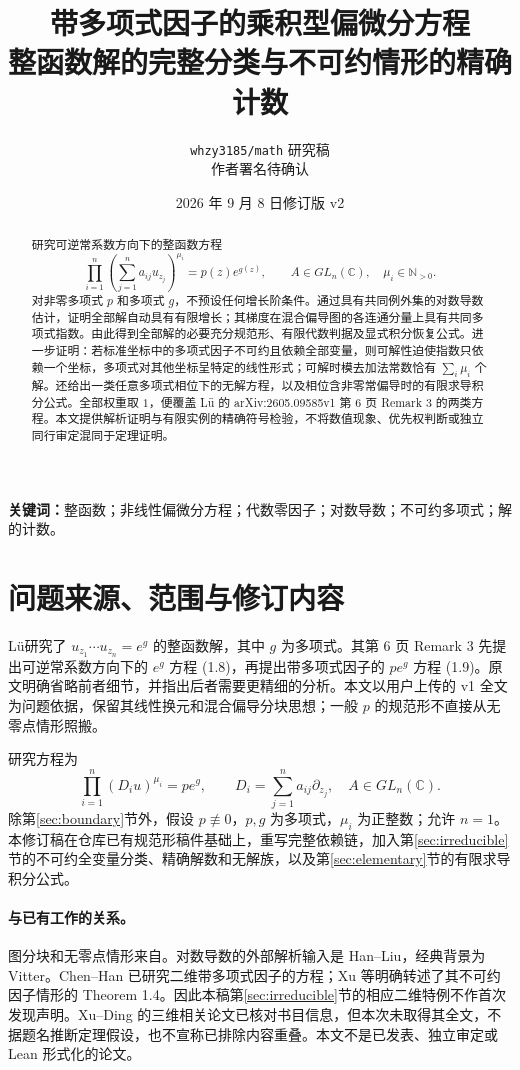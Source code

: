 \documentclass[UTF8,11pt,a4paper,fontset=fandol]{ctexart}
\title{带多项式因子的乘积型偏微分方程\\整函数解的完整分类与不可约情形的精确计数}
\author{\texttt{whzy3185/math} 研究稿\\\small 作者署名待确认}
\date{2026 年 9 月 8 日\quad 修订版 v2}
\theoremstyle{definition}\newtheorem{definition}[theorem]{定义}
\theoremstyle{remark}\newtheorem{remark}[theorem]{注}
\newcommand{\C}{\mathbb C}\newcommand{\N}{\mathbb N}
\begin{document}
\maketitle
\begin{abstract}
研究可逆常系数方向下的整函数方程
\[
\prod_{i=1}^n\left(\sum_{j=1}^n a_{ij}u_{z_j}\right)^{\mu_i}=p(z)e^{g(z)},
\qquad A\in GL_n(\C),\quad \mu_i\in\N_{>0}.
\]
对非零多项式 $p$ 和多项式 $g$，不预设任何增长阶条件。通过具有共同例外集的对数导数估计，证明全部解自动具有有限增长；其梯度在混合偏导图的各连通分量上具有共同多项式指数。由此得到全部解的必要充分规范形、有限代数判据及显式积分恢复公式。进一步证明：若标准坐标中的多项式因子不可约且依赖全部变量，则可解性迫使指数只依赖一个坐标，多项式对其他坐标呈特定的线性形式；可解时模去加法常数恰有 $\sum_i\mu_i$ 个解。还给出一类任意多项式相位下的无解方程，以及相位含非零常偏导时的有限求导积分公式。全部权重取 $1$，便覆盖 Lü 的 arXiv:2605.09585v1 第 6 页 Remark 3 的两类方程。本文提供解析证明与有限实例的精确符号检验，不将数值现象、优先权判断或独立同行审定混同于定理证明。
\end{abstract}
\noindent\textbf{关键词：}整函数；非线性偏微分方程；代数零因子；对数导数；不可约多项式；解的计数。

\section{问题来源、范围与修订内容}
Lü\cite{Lu2026}研究了 $u_{z_1}\cdots u_{z_n}=e^g$ 的整函数解，其中 $g$ 为多项式。其第 6 页 Remark 3 先提出可逆常系数方向下的 $e^g$ 方程 (1.8)，再提出带多项式因子的 $pe^g$ 方程 (1.9)。原文明确省略前者细节，并指出后者需要更精细的分析。本文以用户上传的 v1 全文为问题依据，保留其线性换元和混合偏导分块思想；一般 $p$ 的规范形不直接从无零点情形照搬。

研究方程为
\begin{equation}\label{eq:original}
\prod_{i=1}^n(D_i u)^{\mu_i}=pe^g,
\qquad D_i=\sum_{j=1}^n a_{ij}\partial_{z_j},\quad A\in GL_n(\C).
\end{equation}
除第\ref{sec:boundary}节外，假设 $p\not\equiv0$，$p,g$ 为多项式，$\mu_i$ 为正整数；允许 $n=1$。本修订稿在仓库已有规范形稿件基础上，重写完整依赖链，加入第\ref{sec:irreducible}节的不可约全变量分类、精确解数和无解族，以及第\ref{sec:elementary}节的有限求导积分公式。

\paragraph{与已有工作的关系。}
图分块和无零点情形来自\cite{Lu2026}。对数导数的外部解析输入是 Han--Liu\cite[Theorem 1.1]{HanLiu2025}，经典背景为 Vitter\cite{Vitter1977}。Chen--Han\cite{ChenHan2022} 已研究二维带多项式因子的方程；Xu 等\cite[Theorem D]{XuEtAl2023}明确转述了其不可约因子情形的 Theorem 1.4。因此本稿第\ref{sec:irreducible}节的相应二维特例不作首次发现声明。Xu--Ding\cite{XuDing2026} 的三维相关论文已核对书目信息，但本次未取得其全文，不据题名推断定理假设，也不宣称已排除内容重叠。本文不是已发表、独立审定或 Lean 形式化的论文。
\end{document}
